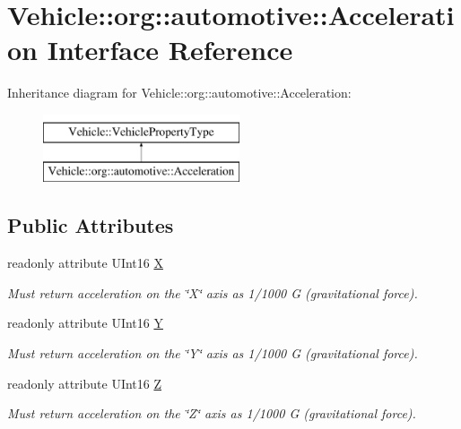 \hypertarget{interfaceVehicle_1_1org_1_1automotive_1_1Acceleration}{\section{Vehicle\-:\-:org\-:\-:automotive\-:\-:Acceleration Interface Reference}
\label{interfaceVehicle_1_1org_1_1automotive_1_1Acceleration}
}
Inheritance diagram for Vehicle\-:\-:org\-:\-:automotive\-:\-:Acceleration\-:\begin{figure}[H]
\begin{center}
\leavevmode
\includegraphics[height=2.000000cm]{interfaceVehicle_1_1org_1_1automotive_1_1Acceleration}
\end{center}
\end{figure}
\subsection*{Public Attributes}
\begin{DoxyCompactItemize}
\item 
readonly attribute U\-Int16 \hyperlink{interfaceVehicle_1_1org_1_1automotive_1_1Acceleration_a8a388939c29b8612c7dba0379eeaca59}{X}
\begin{DoxyCompactList}\small\item\em Must return acceleration on the \char`\"{}\-X\char`\"{} axis as 1/1000 G (gravitational force). \end{DoxyCompactList}\item 
readonly attribute U\-Int16 \hyperlink{interfaceVehicle_1_1org_1_1automotive_1_1Acceleration_aa38385d0e80ba43c508b5ee65a600446}{Y}
\begin{DoxyCompactList}\small\item\em Must return acceleration on the \char`\"{}\-Y\char`\"{} axis as 1/1000 G (gravitational force). \end{DoxyCompactList}\item 
readonly attribute U\-Int16 \hyperlink{interfaceVehicle_1_1org_1_1automotive_1_1Acceleration_ac3502229bcb8cfca46f17b762fc3bdeb}{Z}
\begin{DoxyCompactList}\small\item\em Must return acceleration on the \char`\"{}\-Z\char`\"{} axis as 1/1000 G (gravitational force). \end{DoxyCompactList}\end{DoxyCompactItemize}


